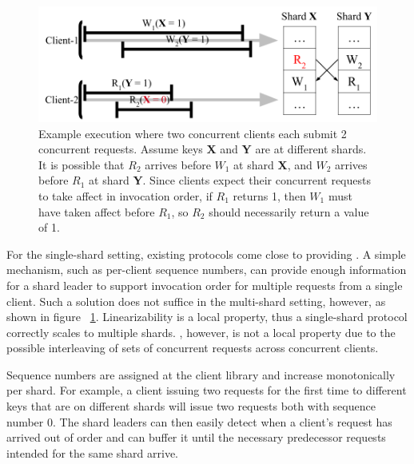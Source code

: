 \begin{figure}[!htb]
    \includegraphics[scale=.45]{figs/somet.png}
    \caption{Example execution where two concurrent clients each submit 2 concurrent requests. Assume keys \textbf{X} and \textbf{Y} are at different shards. It is possible that $R_2$ arrives before $W_1$ at shard \textbf{X}, and $W_2$ arrives before $R_1$ at shard \textbf{Y}. Since clients expect their concurrent requests to take affect in invocation order, if $R_1$ returns 1, then $W_1$ must have taken affect before $R_1$, so $R_2$ should necessarily return a value of 1.}
    \label{fig:concurrentbatches}
\end{figure}

For the single-shard setting, existing protocols come close to providing \MDL{}. A simple mechanism, such as per-client sequence numbers, can provide enough information for a shard leader to support invocation order for multiple requests from a single client. Such a solution does not suffice in the multi-shard setting, however, as shown in figure ~\ref{fig:concurrentbatches}. Linearizability is a local property, thus a single-shard protocol correctly scales to multiple shards. \MDL{}, however, is not a local property due to the possible interleaving of sets of concurrent requests across concurrent clients.

Sequence numbers are assigned at the client library 
and increase monotonically per shard. For example, a client issuing two requests for the first time to different keys that are on different shards will issue two requests both with sequence number 0. The shard leaders can then easily detect when a client's request
has arrived out of order and can buffer it until the necessary predecessor requests intended for the same shard arrive.
